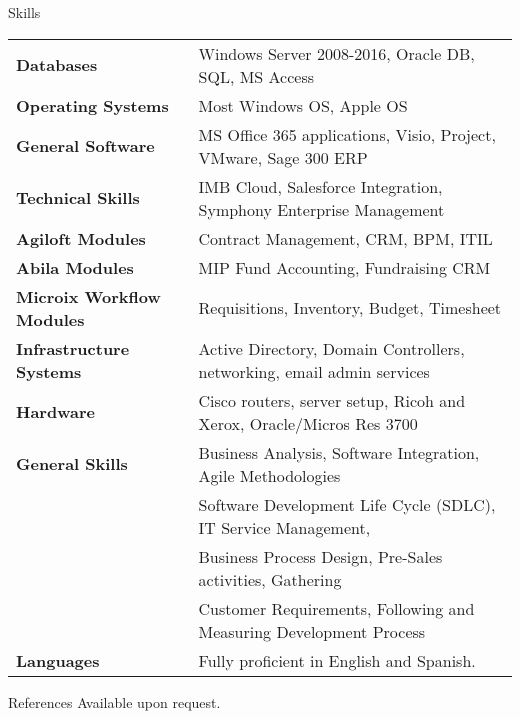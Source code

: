 \documentclass{resume} %
\newcommand{\sectionspace}{\vspace{3mm}}
\begin{document}
\sectionspace
\begin{rSection}{Skills}

\begin{tabular}{ @{} >{\bfseries}l @{\hspace{6ex}} l }
  Databases & Windows Server 2008-2016, Oracle DB, SQL, MS Access \\

  Operating Systems & Most Windows OS, Apple OS \\

  General Software & MS Office 365 applications, Visio, Project, VMware, Sage
  300 ERP \\

  Technical Skills & IMB Cloud, Salesforce Integration, Symphony Enterprise
  Management \\

  Agiloft Modules & Contract Management, CRM, BPM, ITIL \\

  Abila Modules & MIP Fund Accounting, Fundraising CRM \\

  Microix Workflow Modules & Requisitions, Inventory, Budget, Timesheet \\

  Infrastructure Systems & Active Directory, Domain Controllers, networking,
  email admin services \\

  Hardware & Cisco routers, server setup, Ricoh and Xerox, Oracle/Micros Res
  3700 \\

  General Skills & Business Analysis, Software Integration, Agile Methodologies \\

  \space & Software Development Life Cycle (SDLC), IT
  Service Management, \\

  \space & Business Process Design, Pre-Sales activities, Gathering \\

  \space & Customer Requirements, Following and Measuring Development Process \\

  Languages & Fully proficient in English and Spanish.

\end{tabular}

\end{rSection}





\sectionspace
\sectionspace
\begin{rSection}{References}
Available upon request.
\end{rSection}


\end{document}
